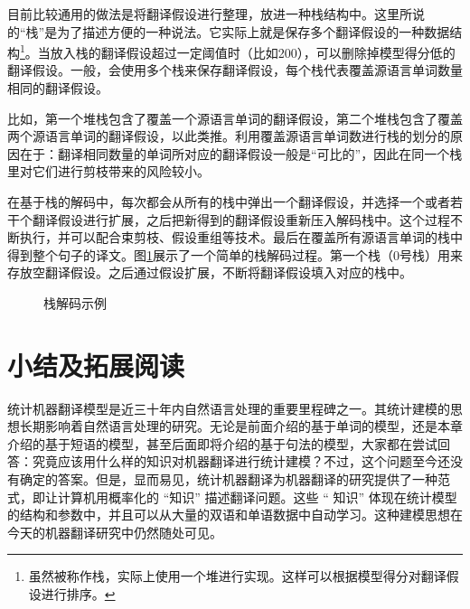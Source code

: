 \parinterval 目前比较通用的做法是将翻译假设进行整理，放进一种栈结构中。这里所说的“栈”是为了描述方便的一种说法。它实际上就是保存多个翻译假设的一种数据结构\footnote[4]{虽然被称作栈，实际上使用一个堆进行实现。这样可以根据模型得分对翻译假设进行排序。}。当放入栈的翻译假设超过一定阈值时（比如200），可以删除掉模型得分低的翻译假设。一般，会使用多个栈来保存翻译假设，每个栈代表覆盖源语言单词数量相同的翻译假设。

\parinterval 比如，第一个堆栈包含了覆盖一个源语言单词的翻译假设，第二个堆栈包含了覆盖两个源语言单词的翻译假设，以此类推。利用覆盖源语言单词数进行栈的划分的原因在于：翻译相同数量的单词所对应的翻译假设一般是“可比的”，因此在同一个栈里对它们进行剪枝带来的风险较小。

\parinterval 在基于栈的解码中，每次都会从所有的栈中弹出一个翻译假设，并选择一个或者若干个翻译假设进行扩展，之后把新得到的翻译假设重新压入解码栈中。这个过程不断执行，并可以配合束剪枝、假设重组等技术。最后在覆盖所有源语言单词的栈中得到整个句子的译文。图\ref{fig:7-27}展示了一个简单的栈解码过程。第一个栈（0号栈）用来存放空翻译假设。之后通过假设扩展，不断将翻译假设填入对应的栈中。

\begin{figure}[htp]
\centering

\caption{栈解码示例}
\label{fig:7-27}
\end{figure}


\sectionnewpage
\section{小结及拓展阅读}\label{section-7.8}

\parinterval 统计机器翻译模型是近三十年内自然语言处理的重要里程碑之一。其统计建模的思想长期影响着自然语言处理的研究。无论是前面介绍的基于单词的模型，还是本章介绍的基于短语的模型，甚至后面即将介绍的基于句法的模型，大家都在尝试回答：究竟应该用什么样的知识对机器翻译进行统计建模？不过，这个问题至今还没有确定的答案。但是，显而易见，统计机器翻译为机器翻译的研究提供了一种范式，即让计算机用概率化的 “知识” 描述翻译问题。这些 “ 知识” 体现在统计模型的结构和参数中，并且可以从大量的双语和单语数据中自动学习。这种建模思想在今天的机器翻译研究中仍然随处可见。

